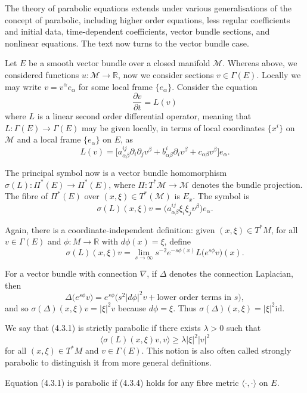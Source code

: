 The theory of parabolic equations extends under various generalisations of the
concept of parabolic, including higher order equations, less regular
coefficients and initial data, time-dependent coefficients, vector bundle
sections, and nonlinear equations. The text now turns to the vector bundle
case.

Let $E$ be a smooth vector bundle over a closed manifold $\mathcal M$.
Whereas above, we considered functions $u : \mathcal M \to \mathbb R$, now we
consider sections $v \in \Gamma(E)$. Locally we may write $v = v^\alpha e_\alpha$
for some local frame $\{e_\alpha\}$. Consider the equation
\[
\frac{\partial v}{\partial t} = L(v)
\tag{4.3.1}
\]
where $L$ is a linear second order differential operator, meaning that $L :
\Gamma(E) \to \Gamma(E)$ may be given locally, in terms of local coordinates
$\{x^i\}$ on $\mathcal M$ and a local frame $\{e_\alpha\}$ on $E$, as
\[
L(v) = \bigl[a^{ij}_{\alpha\beta}\partial_i\partial_j v^\beta
  + b^i_{\alpha\beta}\partial_i v^\beta
  + c_{\alpha\beta}v^\beta\bigr] e_\alpha.
\]

The principal symbol now is a vector bundle homomorphism
$\sigma(L) : \Pi^*(E) \to \Pi^*(E)$, where $\Pi : T^*\mathcal M \to \mathcal M$
denotes the bundle projection. The fibre of $\Pi^*(E)$ over $(x,\xi)\in
T^*(\mathcal M)$ is $E_x$. The symbol is
\[
\sigma(L)(x,\xi)v = \bigl(a^{ij}_{\alpha\beta}\xi_i\xi_j v^\beta\bigr)e_\alpha.
\tag{4.3.2}
\]

Again, there is a coordinate-independent definition: given $(x,\xi)\in T^*M$,
for all $v\in \Gamma(E)$ and $\phi:M\to \mathbb R$ with $d\phi(x)=\xi$,
define
\[
\sigma(L)(x,\xi)v=\lim_{s\to\infty}s^{-2}e^{-s\phi(x)}L\bigl(e^{s\phi}v\bigr)(x).
\tag{4.3.3}
\]

For a vector bundle with connection $\nabla$, if $\Delta$ denotes the
connection Laplacian, then
\[
\Delta\bigl(e^{s\phi}v\bigr)=e^{s\phi}\bigl(s^2|d\phi|^2v+\text{lower order terms in }s\bigr),
\]
and so $\sigma(\Delta)(x,\xi)v=|\xi|^2v$ because $d\phi=\xi$. Thus
$\sigma(\Delta)(x,\xi)=|\xi|^2\mathrm{id}$.

We say that (4.3.1) is strictly parabolic if there exists $\lambda>0$ such that
\[
\langle \sigma(L)(x,\xi)v,v\rangle \ge \lambda |\xi|^2|v|^2
\tag{4.3.4}
\]
for all $(x,\xi)\in T^*M$ and $v\in \Gamma(E)$. This notion is also often
called strongly parabolic to distinguish it from more general definitions.

\begin{remark}
\label{topping-pde-vector-parabolic-fibre-metric}
Equation (4.3.1) is parabolic if (4.3.4) holds for any fibre metric
$\langle\cdot,\cdot\rangle$ on $E$.
\end{remark}

